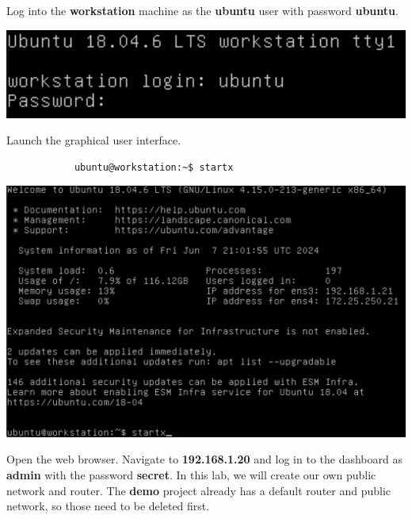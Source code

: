 \documentclass[letterpaper, 12pt]{article}
\begin{document}
\begin{enumerate}
    \begin{labstep}
        Log into the \textbf{workstation} machine as the \textbf{ubuntu} user with password \textbf{ubuntu}.

        \begin{center}
            \includegraphics[width=\linewidth]{images/part1/step1.png}
        \end{center}
    \end{labstep}

    \begin{labstep}
        Launch the graphical user interface.
        \begin{lstlisting}
            ubuntu@workstation:~$ startx
        \end{lstlisting}

        \begin{center}
            \includegraphics[width=\linewidth]{images/part1/step2.png}
        \end{center}
    \end{labstep}

    \begin{labstep}
        Open the web browser.
        Navigate to \textbf{192.168.1.20} and log in to the dashboard as \textbf{admin} with the password \textbf{secret}.
        In this lab, we will create our own public network and router.
        The \textbf{demo} project already has a default router and public network, so those need to be deleted first.


\end{labstep}
\end{enumerate}
\end{document}
